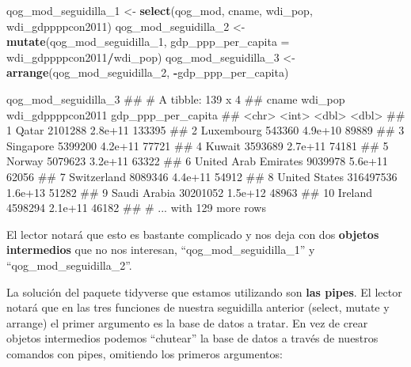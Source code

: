 \documentclass[]{book}
\newenvironment{Shaded}{\begin{snugshade}}{\end{snugshade}}
\newcommand{\KeywordTok}[1]{\textcolor[rgb]{0.13,0.29,0.53}{\textbf{#1}}}
\newcommand{\DataTypeTok}[1]{\textcolor[rgb]{0.13,0.29,0.53}{#1}}
\newcommand{\DecValTok}[1]{\textcolor[rgb]{0.00,0.00,0.81}{#1}}
\newcommand{\StringTok}[1]{\textcolor[rgb]{0.31,0.60,0.02}{#1}}
\newcommand{\OperatorTok}[1]{\textcolor[rgb]{0.81,0.36,0.00}{\textbf{#1}}}
\newcommand{\NormalTok}[1]{#1}
\begin{document}
\begin{Shaded}
\begin{Highlighting}[]
\NormalTok{qog_mod_seguidilla_}\DecValTok{1}\NormalTok{ <-}\StringTok{ }\KeywordTok{select}\NormalTok{(qog_mod, cname, wdi_pop, wdi_gdppppcon2011)}
\NormalTok{qog_mod_seguidilla_}\DecValTok{2}\NormalTok{ <-}\StringTok{ }\KeywordTok{mutate}\NormalTok{(qog_mod_seguidilla_}\DecValTok{1}\NormalTok{, }
                               \DataTypeTok{gdp_ppp_per_capita =}\NormalTok{ wdi_gdppppcon2011}\OperatorTok{/}\NormalTok{wdi_pop)}
\NormalTok{qog_mod_seguidilla_}\DecValTok{3}\NormalTok{ <-}\StringTok{ }\KeywordTok{arrange}\NormalTok{(qog_mod_seguidilla_}\DecValTok{2}\NormalTok{, }\OperatorTok{-}\NormalTok{gdp_ppp_per_capita)}
\end{Highlighting}
\end{Shaded}

\begin{Shaded}
\begin{Highlighting}[]
\NormalTok{qog_mod_seguidilla_}\DecValTok{3}
\NormalTok{## # A tibble: 139 x 4}
\NormalTok{##                   cname   wdi_pop wdi_gdppppcon2011 gdp_ppp_per_capita}
\NormalTok{##                   <chr>     <int>             <dbl>              <dbl>}
\NormalTok{##  1                Qatar   2101288           2.8e+11             133395}
\NormalTok{##  2           Luxembourg    543360           4.9e+10              89889}
\NormalTok{##  3            Singapore   5399200           4.2e+11              77721}
\NormalTok{##  4               Kuwait   3593689           2.7e+11              74181}
\NormalTok{##  5               Norway   5079623           3.2e+11              63322}
\NormalTok{##  6 United Arab Emirates   9039978           5.6e+11              62056}
\NormalTok{##  7          Switzerland   8089346           4.4e+11              54912}
\NormalTok{##  8        United States 316497536           1.6e+13              51282}
\NormalTok{##  9         Saudi Arabia  30201052           1.5e+12              48963}
\NormalTok{## 10              Ireland   4598294           2.1e+11              46182}
\NormalTok{## # ... with 129 more rows}
\end{Highlighting}
\end{Shaded}

El lector notará que esto es bastante complicado y nos deja con dos
\textbf{objetos intermedios} que no nos interesan,
``qog\_mod\_seguidilla\_1'' y ``qog\_mod\_seguidilla\_2''.

La solución del paquete tidyverse que estamos utilizando son \textbf{las
pipes}. El lector notará que en las tres funciones de nuestra seguidilla
anterior (select, mutate y arrange) el primer argumento es la base de
datos a tratar. En vez de crear objetos intermedios podemos ``chutear''
la base de datos a través de nuestros comandos con pipes, omitiendo los
primeros argumentos:
\end{document}
